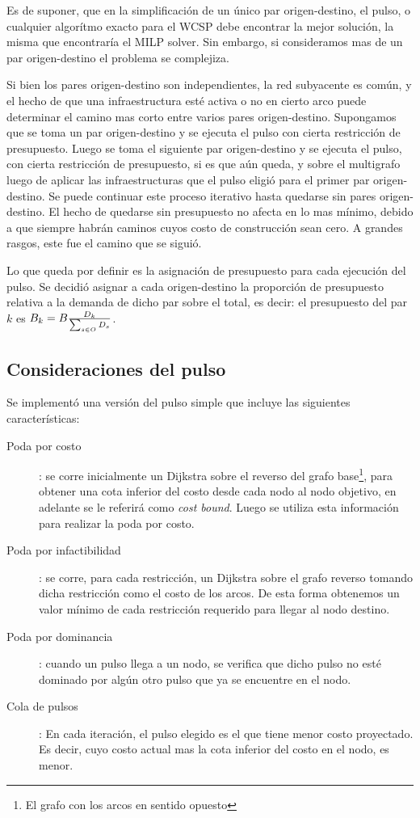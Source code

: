 \documentclass{article}
\begin{document}
  Es de suponer, que en la simplificación de un único par origen-destino, el pulso, o cualquier algorítmo exacto para el WCSP debe encontrar la mejor solución, la misma que encontraría el MILP solver. Sin embargo, si consideramos mas de un par origen-destino el problema se complejiza.

  Si bien los pares origen-destino son independientes, la red subyacente es común, y el hecho de que una infraestructura esté activa o no en cierto arco puede determinar el camino mas corto entre varios pares origen-destino. Supongamos que se toma un par origen-destino y se ejecuta el pulso con cierta restricción de presupuesto. Luego se toma el siguiente par origen-destino y se ejecuta el pulso, con cierta restricción de presupuesto, si es que aún queda, y sobre el multigrafo luego de aplicar las infraestructuras que el pulso eligió para el primer par origen-destino. Se puede continuar este proceso iterativo hasta quedarse sin pares origen-destino. El hecho de quedarse sin presupuesto no afecta en lo mas mínimo, debido a que siempre habrán caminos cuyos costo de construcción sean cero. A grandes rasgos, este fue el camino que se siguió.

  Lo que queda por definir es la asignación de presupuesto para cada ejecución del pulso. Se decidió asignar a cada origen-destino la proporción de presupuesto relativa a la demanda de dicho par sobre el total, es decir: el presupuesto del par $k$ es $B_k = B  {D_k \over \sum_{s \in O} D_s}$.

  \subsection*{Consideraciones del pulso}

  Se implementó una versión del pulso simple que incluye las siguientes características:

  \begin{description}
    \item[Poda por costo]: {se corre inicialmente un Dijkstra sobre el reverso del grafo base\footnote{El grafo con los arcos en sentido opuesto}, para obtener una cota inferior del costo desde cada nodo al nodo objetivo, en adelante se le referirá como {\it cost bound}. Luego se utiliza esta información para realizar la poda por costo.}
    \item[Poda por infactibilidad]: {se corre, para cada restricción, un Dijkstra sobre el grafo reverso tomando dicha restricción como el costo de los arcos. De esta forma obtenemos un valor mínimo de cada restricción requerido para llegar al nodo destino.}
    \item[Poda por dominancia]: {cuando un pulso llega a un nodo, se verifica que dicho pulso no esté dominado por algún otro pulso que ya se encuentre en el nodo.}
    \item[Cola de pulsos]: {En cada iteración, el pulso elegido es el que tiene menor costo proyectado. Es decir, cuyo costo actual mas la cota inferior del costo en el nodo, es menor.}
  \end{description}
\end{document}

